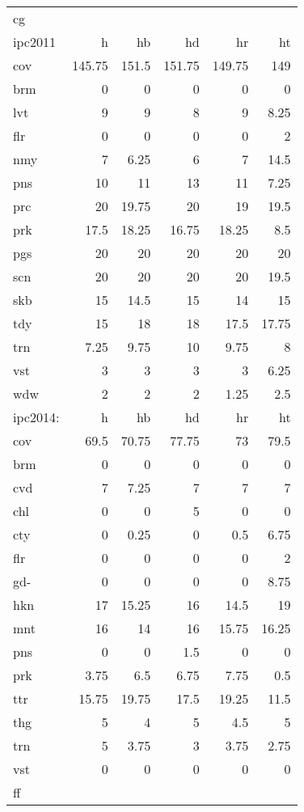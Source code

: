 \begin{center}
\begin{tabular}{lrrrrr}
\hline
cg &  &  &  &  & \\
ipc2011 & h & hb & hd & hr & ht\\
\hline
cov & 145.75 & 151.5 & 151.75 & 149.75 & 149\\
\hline
brm & 0 & 0 & 0 & 0 & 0\\
lvt & 9 & 9 & 8 & 9 & 8.25\\
flr & 0 & 0 & 0 & 0 & 2\\
nmy & 7 & 6.25 & 6 & 7 & 14.5\\
pns & 10 & 11 & 13 & 11 & 7.25\\
prc & 20 & 19.75 & 20 & 19 & 19.5\\
prk & 17.5 & 18.25 & 16.75 & 18.25 & 8.5\\
pgs & 20 & 20 & 20 & 20 & 20\\
scn & 20 & 20 & 20 & 20 & 19.5\\
skb & 15 & 14.5 & 15 & 14 & 15\\
tdy & 15 & 18 & 18 & 17.5 & 17.75\\
trn & 7.25 & 9.75 & 10 & 9.75 & 8\\
vst & 3 & 3 & 3 & 3 & 6.25\\
wdw & 2 & 2 & 2 & 1.25 & 2.5\\
\hline
ipc2014: & h & hb & hd & hr & ht\\
\hline
cov & 69.5 & 70.75 & 77.75 & 73 & 79.5\\
\hline
brm & 0 & 0 & 0 & 0 & 0\\
cvd & 7 & 7.25 & 7 & 7 & 7\\
chl & 0 & 0 & 5 & 0 & 0\\
cty & 0 & 0.25 & 0 & 0.5 & 6.75\\
flr & 0 & 0 & 0 & 0 & 2\\
gd- & 0 & 0 & 0 & 0 & 8.75\\
hkn & 17 & 15.25 & 16 & 14.5 & 19\\
mnt & 16 & 14 & 16 & 15.75 & 16.25\\
pns & 0 & 0 & 1.5 & 0 & 0\\
prk & 3.75 & 6.5 & 6.75 & 7.75 & 0.5\\
ttr & 15.75 & 19.75 & 17.5 & 19.25 & 11.5\\
thg & 5 & 4 & 5 & 4.5 & 5\\
trn & 5 & 3.75 & 3 & 3.75 & 2.75\\
vst & 0 & 0 & 0 & 0 & 0\\
\hline
ff &  &  &  &  & \\

\end{tabular}
\end{center}
